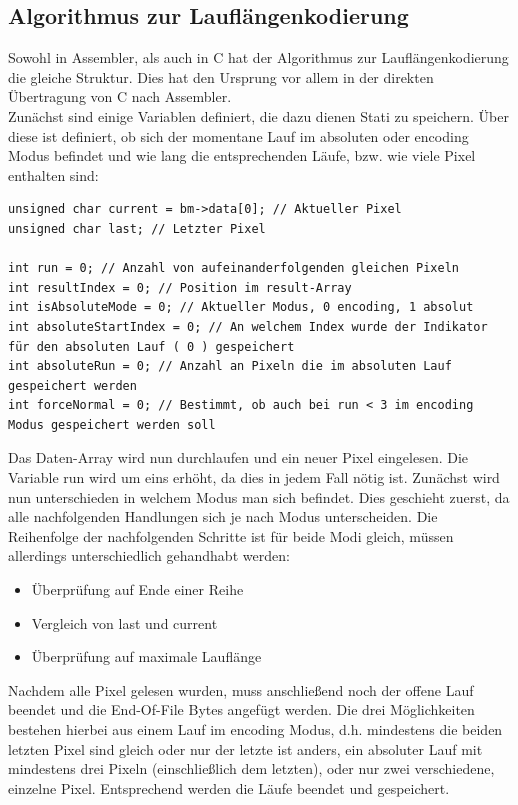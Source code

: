 \documentclass[11pt]{scrartcl}
\begin{document}
\subsection{Algorithmus zur Lauflängenkodierung}
Sowohl in Assembler, als auch in C hat der Algorithmus zur Lauflängenkodierung die gleiche Struktur. Dies hat den Ursprung vor allem in der direkten Übertragung von C nach Assembler.\\
Zunächst sind einige Variablen definiert, die dazu dienen Stati zu speichern. Über diese ist definiert, ob sich der momentane Lauf im absoluten oder encoding Modus befindet und wie lang die entsprechenden Läufe, bzw. wie viele Pixel enthalten sind:
\begin{lstlisting}[caption={Variablen},frame=single, captionpos=b, label=code-comm-task, xleftmargin=.03\textwidth]
unsigned char current = bm->data[0]; // Aktueller Pixel
unsigned char last; // Letzter Pixel

int run = 0; // Anzahl von aufeinanderfolgenden gleichen Pixeln
int resultIndex = 0; // Position im result-Array
int isAbsoluteMode = 0; // Aktueller Modus, 0 encoding, 1 absolut
int absoluteStartIndex = 0; // An welchem Index wurde der Indikator für den absoluten Lauf ( 0 ) gespeichert
int absoluteRun = 0; // Anzahl an Pixeln die im absoluten Lauf gespeichert werden
int forceNormal = 0; // Bestimmt, ob auch bei run < 3 im encoding Modus gespeichert werden soll
\end{lstlisting}
Das Daten-Array wird nun durchlaufen und ein neuer Pixel eingelesen. Die Variable run wird um eins erhöht, da dies in jedem Fall nötig ist. Zunächst wird nun unterschieden in welchem Modus man sich befindet. Dies geschieht zuerst, da alle nachfolgenden Handlungen sich je nach Modus unterscheiden. Die Reihenfolge der nachfolgenden Schritte ist für beide Modi gleich, müssen allerdings unterschiedlich gehandhabt werden:
\begin{itemize}
\item Überprüfung auf Ende einer Reihe
\item Vergleich von last und current
\item Überprüfung auf maximale Lauflänge
\end{itemize}
Nachdem alle Pixel gelesen wurden, muss anschließend noch der offene Lauf beendet und die End-Of-File Bytes angefügt werden. Die drei Möglichkeiten bestehen hierbei aus einem Lauf im encoding Modus, d.h. mindestens die beiden letzten Pixel sind gleich oder nur der letzte ist anders, ein absoluter Lauf mit mindestens drei Pixeln (einschließlich dem letzten), oder nur zwei verschiedene, einzelne Pixel. Entsprechend werden die Läufe beendet und gespeichert.
\end{document}
